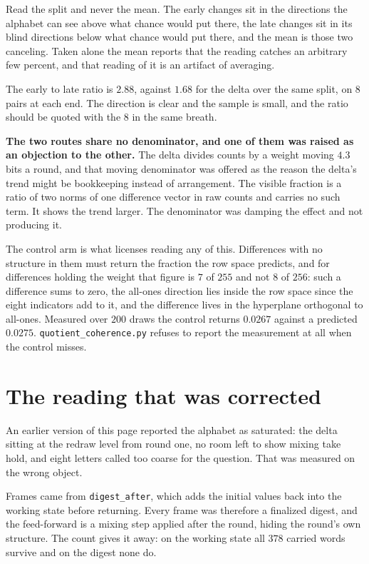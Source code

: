 Read the split and never the mean. The early changes sit in the directions the alphabet can see above what chance would put there, the late changes sit in its blind directions below what chance would put there, and the mean is those two canceling. Taken alone the mean reports that the reading catches an arbitrary few percent, and that reading of it is an artifact of averaging.

The early to late ratio is \(2.88\), against \(1.68\) for the delta over the same split, on \(8\) pairs at each end. The direction is clear and the sample is small, and the ratio should be quoted with the \(8\) in the same breath.

\textbf{The two routes share no denominator, and one of them was raised as an objection to the other.} The delta divides counts by a weight moving \(4.3\) bits a round, and that moving denominator was offered as the reason the delta's trend might be bookkeeping instead of arrangement. The visible fraction is a ratio of two norms of one difference vector in raw counts and carries no such term. It shows the trend larger. The denominator was damping the effect and not producing it.

The control arm is what licenses reading any of this. Differences with no structure in them must return the fraction the row space predicts, and for differences holding the weight that figure is \(7\) of \(255\) and not \(8\) of \(256\): such a difference sums to zero, the all-ones direction lies inside the row space since the eight indicators add to it, and the difference lives in the hyperplane orthogonal to all-ones. Measured over \(200\) draws the control returns \(0.0267\) against a predicted \(0.0275\). \texttt{quotient\_coherence.py} refuses to report the measurement at all when the control misses.

\section{The reading that was corrected}

An earlier version of this page reported the alphabet as saturated: the delta sitting at the redraw level from round one, no room left to show mixing take hold, and eight letters called too coarse for the question. That was measured on the wrong object.

Frames came from \texttt{digest\_after}, which adds the initial values back into the working state before returning. Every frame was therefore a finalized digest, and the feed-forward is a mixing step applied after the round, hiding the round's own structure. The count gives it away: on the working state all \(378\) carried words survive and on the digest none do.

